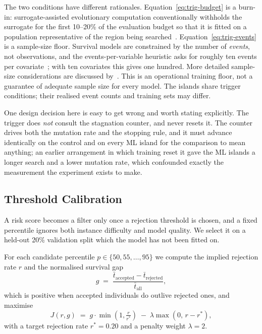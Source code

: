 \documentclass[a4paper,fleqn]{cas-dc}
\begin{document}
The two conditions have different rationales. Equation~\eqref{eq:trig-budget} is
a burn-in: surrogate-assisted evolutionary computation conventionally withholds
the surrogate for the first 10--20\% of the evaluation budget so that it is
fitted on a population representative of the region being
searched~\citep{jin2005comprehensive,lim2010generalizing}.
Equation~\eqref{eq:trig-events} is a sample-size floor. Survival models are
constrained by the number of \emph{events}, not observations, and the
events-per-variable heuristic asks for roughly ten events per
covariate~\citep{peduzzi1995importance}; with ten covariates this gives one
hundred. More detailed sample-size considerations are discussed
by~\citet{riley2019minimum}. This is an operational training floor, not a
guarantee of adequate sample size for every model. The islands share trigger
conditions; their realised event counts and training sets may differ.

One design decision here is easy to get wrong and worth stating explicitly. The
trigger does \emph{not} consult the stagnation counter, and never resets it. The
counter drives both the mutation rate and the stopping rule, and it must advance
identically on the control and on every ML island for the comparison to mean
anything; an earlier arrangement in which training reset it gave the ML islands
a longer search and a lower mutation rate, which confounded exactly the
measurement the experiment exists to make.

\subsection{Threshold Calibration}\label{sec:fw-threshold}

A risk score becomes a filter only once a rejection threshold is chosen, and a
fixed percentile ignores both instance difficulty and model quality. We select
it on a held-out 20\% validation split which the model has not been fitted on.

For each candidate percentile $p \in \{50, 55, \dots, 95\}$ we compute the
implied rejection rate $r$ and the normalised survival gap
\begin{equation}
g \;=\; \frac{\bar{t}_{\text{accepted}} - \bar{t}_{\text{rejected}}}
              {\bar{t}_{\text{all}}},
\end{equation}
which is positive when accepted individuals do outlive rejected ones, and
maximise
\begin{equation}
J(r, g) \;=\; g \cdot \min\!\left(1, \tfrac{r}{r^{*}}\right)
              \;-\; \lambda \max(0,\, r - r^{*}),
\label{eq:softcap}
\end{equation}
with a target rejection rate $r^{*} = 0.20$ and a penalty weight $\lambda = 2$.
\end{document}

